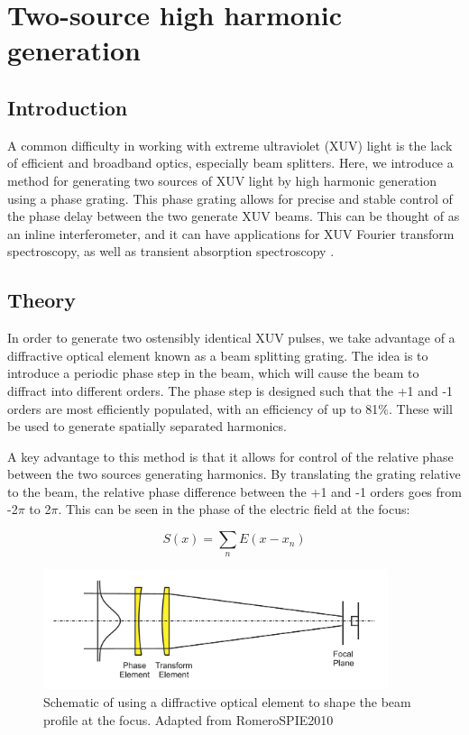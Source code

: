 \chapter{Two-source high harmonic generation}
\label{two_source}

\section{Introduction}
\label{intro_ts}

A common difficulty in working with extreme ultraviolet (XUV) light is the lack of efficient and broadband optics, especially beam splitters. Here, we introduce a method for generating two sources of XUV light by high harmonic generation using a phase grating.  This phase grating allows for precise and stable control of the phase delay between the two generate XUV beams.  This can be thought of as an inline interferometer, and it can have applications for XUV Fourier transform spectroscopy, as well as transient absorption spectroscopy \cite{diffuse}.

\section{Theory}
\label{theory_ts}

In order to generate two ostensibly identical XUV pulses, we take advantage of a diffractive optical element known as a beam splitting grating.\cite{ROMERO_chapter6}   The idea is to introduce a periodic phase step in the beam, which will cause the beam to diffract into different orders.  The phase step is designed such that the +1 and -1 orders are most efficiently populated, with an efficiency of up to 81$\%$.  These will be used to generate spatially separated harmonics.

A key advantage to this method is that it allows for control of the relative phase between the two sources generating harmonics.  By translating the grating relative to the beam, the relative phase difference between the +1 and -1 orders goes from -2$\pi$ to 2$\pi$.  This can be seen in the phase of the electric field at the focus:

\begin{equation}\label{ep:field}
	S(x) = \sum_{n} E(x - x_{n})
\end{equation}

\begin{figure}
	\centering
	\includegraphics[width=0.9\textwidth]{figures/Two_source/romero_beam_shaping_schematic.png}
	\caption{Schematic of using a diffractive optical element to shape the beam profile at the focus. Adapted from RomeroSPIE2010}
	\label{fourier_beam_shaping_scheme}
\end{figure}

